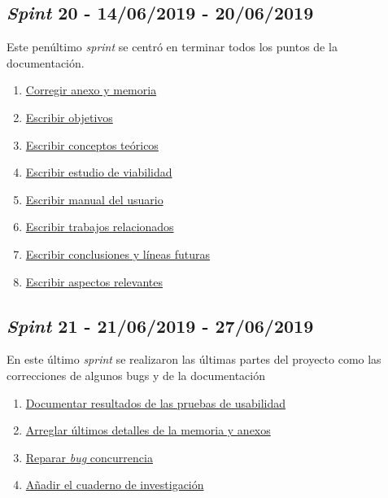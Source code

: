 \subsection{\textit{Spint} 20 - 14/06/2019 - 20/06/2019}
Este penúltimo \textit{sprint} se centró en terminar todos los puntos de la documentación.

\begin{enumerate}\addtocounter{enumi}{97}
	\item 
	\href{https://github.com/jlgarridol/TFG-SmartBeds/issues/98}{Corregir anexo y memoria}
	\item 
	\href{https://github.com/jlgarridol/TFG-SmartBeds/issues/99}{Escribir objetivos}
	\item 
	\href{https://github.com/jlgarridol/TFG-SmartBeds/issues/100}{Escribir conceptos teóricos}
	\item 
	\href{https://github.com/jlgarridol/TFG-SmartBeds/issues/101}{Escribir estudio de viabilidad}
	\item 
	\href{https://github.com/jlgarridol/TFG-SmartBeds/issues/102}{Escribir manual del usuario}
	\item 
	\href{https://github.com/jlgarridol/TFG-SmartBeds/issues/103}{Escribir trabajos relacionados}
	\item 
	\href{https://github.com/jlgarridol/TFG-SmartBeds/issues/104}{Escribir conclusiones y líneas futuras}
	\item 
	\href{https://github.com/jlgarridol/TFG-SmartBeds/issues/105}{Escribir aspectos relevantes}
\end{enumerate}

\subsection{\textit{Spint} 21 - 21/06/2019 - 27/06/2019}
En este último \textit{sprint} se realizaron las últimas partes del proyecto como las correcciones de algunos bugs y de la documentación

\begin{enumerate}\addtocounter{enumi}{105}
	\item 
	\href{https://github.com/jlgarridol/TFG-SmartBeds/issues/106}{Documentar resultados de las pruebas de usabilidad}
	\item 
	\href{https://github.com/jlgarridol/TFG-SmartBeds/issues/107}{Arreglar últimos detalles de la memoria y anexos}
	\item 
	\href{https://github.com/jlgarridol/TFG-SmartBeds/issues/108}{Reparar \textit{bug} concurrencia}
	\item 
	\href{https://github.com/jlgarridol/TFG-SmartBeds/issues/109}{Añadir el cuaderno de investigación}
\end{enumerate}

